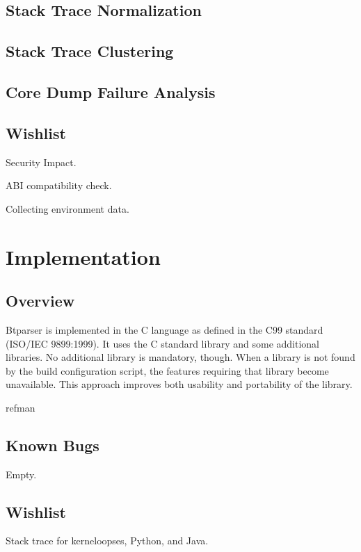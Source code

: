 \documentclass[a4paper]{book}
\begin{document}
\chapter{Stack Trace Normalization}

\chapter{Stack Trace Clustering}

\chapter{Core Dump Failure Analysis}

\chapter{Wishlist}
Security Impact.

ABI compatibility check.

Collecting environment data.

\part{Implementation}

\chapter{Overview}
Btparser is implemented in the C language as defined in the C99
standard (ISO/IEC 9899:1999).  It uses the C standard library and some
additional libraries.  No additional library is mandatory, though.
When a library is not found by the build configuration script, the
features requiring that library become unavailable.  This approach
improves both usability and portability of the library.

{refman}

\chapter{Known Bugs}
Empty.

\chapter{Wishlist}
Stack trace for kerneloopses, Python, and Java.

\clearpage
{}
\printindex
\end{document}
